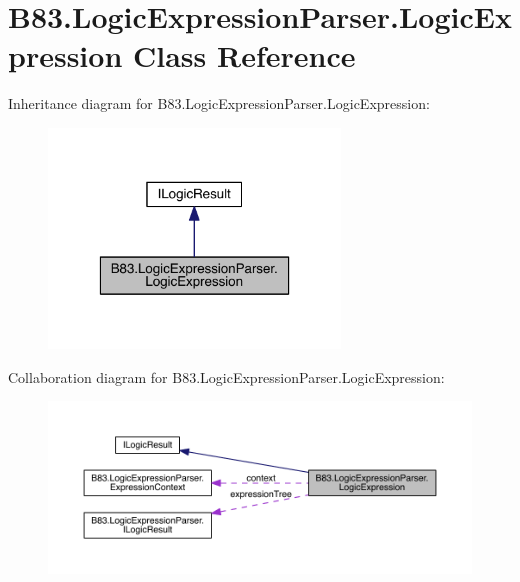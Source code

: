 \hypertarget{class_b83_1_1_logic_expression_parser_1_1_logic_expression}{}\section{B83.\+Logic\+Expression\+Parser.\+Logic\+Expression Class Reference}
\label{class_b83_1_1_logic_expression_parser_1_1_logic_expression}


Inheritance diagram for B83.\+Logic\+Expression\+Parser.\+Logic\+Expression\+:\nopagebreak
\begin{figure}[H]
\begin{center}
\leavevmode
\includegraphics[width=220pt]{class_b83_1_1_logic_expression_parser_1_1_logic_expression__inherit__graph}
\end{center}
\end{figure}


Collaboration diagram for B83.\+Logic\+Expression\+Parser.\+Logic\+Expression\+:\nopagebreak
\begin{figure}[H]
\begin{center}
\leavevmode
\includegraphics[width=350pt]{class_b83_1_1_logic_expression_parser_1_1_logic_expression__coll__graph}
\end{center}
\end{figure}
